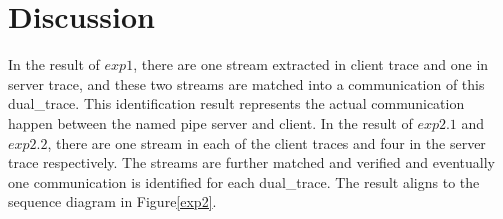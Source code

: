 \section{Discussion}
In the result of $exp1$, there are one stream extracted in client trace and one in server trace, and these two streams are matched into a communication of this dual\_trace. This identification result represents the actual communication happen between the named pipe server and client.
In the result of $exp2.1$ and $exp2.2$, there are one stream in each of the client traces and four in the server trace respectively. The streams are further matched and verified and eventually one communication is identified for each dual\_trace. The result aligns to the sequence diagram in Figure\ref{exp2}.


   




